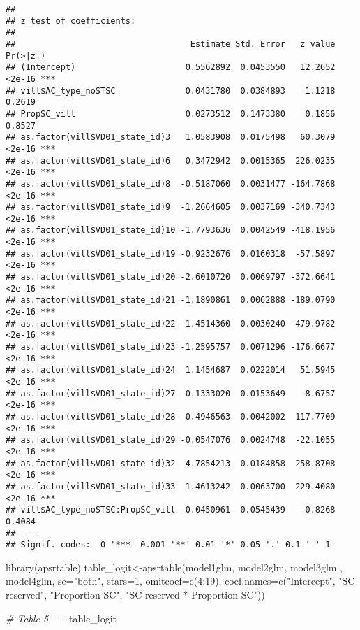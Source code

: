 \documentclass[
]{article}
\newenvironment{Shaded}{\begin{snugshade}}{\end{snugshade}}
\newcommand{\AttributeTok}[1]{\textcolor[rgb]{0.77,0.63,0.00}{#1}}
\newcommand{\CommentTok}[1]{\textcolor[rgb]{0.56,0.35,0.01}{\textit{#1}}}
\newcommand{\DecValTok}[1]{\textcolor[rgb]{0.00,0.00,0.81}{#1}}
\newcommand{\FunctionTok}[1]{\textcolor[rgb]{0.00,0.00,0.00}{#1}}
\newcommand{\NormalTok}[1]{#1}
\newcommand{\OtherTok}[1]{\textcolor[rgb]{0.56,0.35,0.01}{#1}}
\newcommand{\SpecialCharTok}[1]{\textcolor[rgb]{0.00,0.00,0.00}{#1}}
\newcommand{\StringTok}[1]{\textcolor[rgb]{0.31,0.60,0.02}{#1}}
\begin{document}
\begin{verbatim}
## 
## z test of coefficients:
## 
##                                   Estimate Std. Error   z value Pr(>|z|)    
## (Intercept)                      0.5562892  0.0453550   12.2652   <2e-16 ***
## vill$AC_type_noSTSC              0.0431780  0.0384893    1.1218   0.2619    
## PropSC_vill                      0.0273512  0.1473380    0.1856   0.8527    
## as.factor(vill$VD01_state_id)3   1.0583908  0.0175498   60.3079   <2e-16 ***
## as.factor(vill$VD01_state_id)6   0.3472942  0.0015365  226.0235   <2e-16 ***
## as.factor(vill$VD01_state_id)8  -0.5187060  0.0031477 -164.7868   <2e-16 ***
## as.factor(vill$VD01_state_id)9  -1.2664605  0.0037169 -340.7343   <2e-16 ***
## as.factor(vill$VD01_state_id)10 -1.7793636  0.0042549 -418.1956   <2e-16 ***
## as.factor(vill$VD01_state_id)19 -0.9232676  0.0160318  -57.5897   <2e-16 ***
## as.factor(vill$VD01_state_id)20 -2.6010720  0.0069797 -372.6641   <2e-16 ***
## as.factor(vill$VD01_state_id)21 -1.1890861  0.0062888 -189.0790   <2e-16 ***
## as.factor(vill$VD01_state_id)22 -1.4514360  0.0030240 -479.9782   <2e-16 ***
## as.factor(vill$VD01_state_id)23 -1.2595757  0.0071296 -176.6677   <2e-16 ***
## as.factor(vill$VD01_state_id)24  1.1454687  0.0222014   51.5945   <2e-16 ***
## as.factor(vill$VD01_state_id)27 -0.1333020  0.0153649   -8.6757   <2e-16 ***
## as.factor(vill$VD01_state_id)28  0.4946563  0.0042002  117.7709   <2e-16 ***
## as.factor(vill$VD01_state_id)29 -0.0547076  0.0024748  -22.1055   <2e-16 ***
## as.factor(vill$VD01_state_id)32  4.7854213  0.0184858  258.8708   <2e-16 ***
## as.factor(vill$VD01_state_id)33  1.4613242  0.0063700  229.4080   <2e-16 ***
## vill$AC_type_noSTSC:PropSC_vill -0.0450961  0.0545439   -0.8268   0.4084    
## ---
## Signif. codes:  0 '***' 0.001 '**' 0.01 '*' 0.05 '.' 0.1 ' ' 1
\end{verbatim}

\begin{Shaded}
\begin{Highlighting}[]
\FunctionTok{library}\NormalTok{(apsrtable)}
\NormalTok{table\_logit}\OtherTok{\textless{}{-}}\FunctionTok{apsrtable}\NormalTok{(model1glm, model2glm, model3glm , model4glm, }\AttributeTok{se=}\StringTok{"both"}\NormalTok{, }\AttributeTok{stars=}\DecValTok{1}\NormalTok{, }\AttributeTok{omitcoef=}\FunctionTok{c}\NormalTok{(}\DecValTok{4}\SpecialCharTok{:}\DecValTok{19}\NormalTok{), }\AttributeTok{coef.names=}\FunctionTok{c}\NormalTok{(}\StringTok{"Intercept"}\NormalTok{, }\StringTok{"SC reserved"}\NormalTok{, }\StringTok{"Proportion SC"}\NormalTok{, }\StringTok{"SC reserved * Proportion SC"}\NormalTok{))}

\CommentTok{\# Table 5 {-}{-}{-}{-}}
\NormalTok{table\_logit}
\end{Highlighting}
\end{Shaded}
\end{document}
